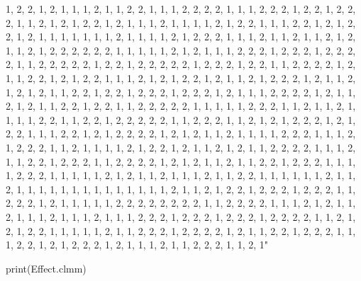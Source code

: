 \documentclass[
]{article}
\begin{document}
\begin{Schunk}
\begin{Soutput}
1, 2, 2, 1, 2, 1, 1, 1, 2, 1, 1, 2, 2, 1, 1, 1, 2, 2, 2, 2, 1, 1, 1, 2, 2, 2, 1, 2, 2, 1, 2, 2, 2, 1, 1, 2, 1, 2, 1, 2, 2, 1, 2, 1, 1, 1, 2, 1, 1, 1, 1, 2, 1, 2, 2, 1, 1, 1, 2, 2, 1, 2, 1, 2, 2, 1, 2, 1, 1, 1, 1, 1, 1, 1, 2, 1, 1, 1, 1, 2, 1, 2, 2, 2, 1, 1, 1, 2, 1, 1, 2, 1, 1, 2, 1, 2, 1, 1, 2, 1, 2, 2, 2, 2, 2, 2, 1, 1, 1, 1, 1, 2, 1, 2, 1, 1, 1, 2, 2, 2, 1, 2, 2, 2, 1, 2, 2, 2, 2, 1, 1, 2, 2, 2, 2, 2, 1, 2, 2, 1, 2, 2, 2, 2, 2, 1, 2, 2, 2, 1, 2, 2, 1, 1, 2, 2, 2, 2, 1, 2, 1, 1, 2, 2, 1, 2, 1, 2, 2, 1, 1, 1, 2, 1, 2, 1, 2, 2, 1, 2, 1, 1, 2, 1, 2, 2, 2, 1, 2, 1, 1, 2, 1, 2, 1, 2, 1, 1, 2, 2, 1, 2, 2, 1, 2, 2, 2, 1, 2, 2, 2, 1, 2, 1, 1, 1, 2, 2, 2, 2, 1, 2, 1, 1, 2, 1, 2, 1, 1, 2, 2, 1, 2, 2, 1, 1, 2, 2, 2, 2, 2, 1, 1, 1, 1, 1, 2, 2, 2, 1, 1, 2, 1, 1, 2, 1, 1, 1, 1, 2, 2, 1, 1, 2, 2, 1, 2, 2, 2, 2, 2, 1, 1, 2, 2, 2, 1, 1, 2, 1, 2, 1, 2, 2, 2, 1, 2, 1, 2, 2, 1, 1, 1, 2, 2, 1, 2, 1, 2, 2, 2, 2, 1, 2, 1, 2, 1, 1, 2, 1, 1, 1, 1, 2, 2, 2, 1, 1, 1, 2, 1, 2, 2, 2, 1, 1, 2, 1, 1, 1, 1, 2, 1, 2, 2, 1, 2, 1, 1, 2, 1, 2, 1, 1, 2, 2, 2, 2, 1, 1, 1, 2, 1, 1, 2, 2, 1, 2, 2, 2, 1, 1, 2, 2, 2, 2, 1, 2, 1, 2, 1, 1, 2, 1, 1, 2, 2, 1, 2, 2, 2, 1, 1, 1, 1, 2, 2, 2, 1, 1, 1, 1, 1, 2, 1, 2, 1, 1, 2, 1, 1, 1, 2, 1, 1, 2, 2, 1, 1, 1, 1, 1, 1, 2, 1, 1, 2, 1, 1, 1, 1, 1, 1, 1, 1, 1, 1, 1, 1, 1, 1, 2, 1, 1, 2, 1, 2, 2, 1, 2, 2, 2, 1, 2, 2, 2, 1, 1, 2, 2, 2, 1, 2, 1, 1, 1, 1, 1, 2, 2, 2, 2, 2, 2, 2, 2, 1, 1, 2, 2, 2, 2, 1, 1, 1, 2, 1, 2, 1, 1, 2, 1, 1, 1, 2, 1, 1, 1, 2, 1, 1, 1, 2, 2, 2, 1, 2, 2, 2, 1, 2, 2, 2, 1, 2, 2, 2, 2, 1, 1, 2, 1, 2, 1, 2, 2, 1, 1, 1, 1, 1, 2, 1, 1, 2, 2, 2, 1, 2, 2, 2, 2, 1, 2, 1, 1, 2, 2, 1, 2, 2, 2, 1, 1, 1, 2, 2, 1, 2, 1, 2, 2, 2, 1, 2, 1, 1, 1, 2, 1, 1, 2, 2, 2, 1, 1, 2, 1" 
\end{Soutput}
\end{Schunk}
\begin{Schunk}
\begin{Sinput}
 print(Effect.clmm)
\end{Sinput}
\end{Schunk}
\end{document}
